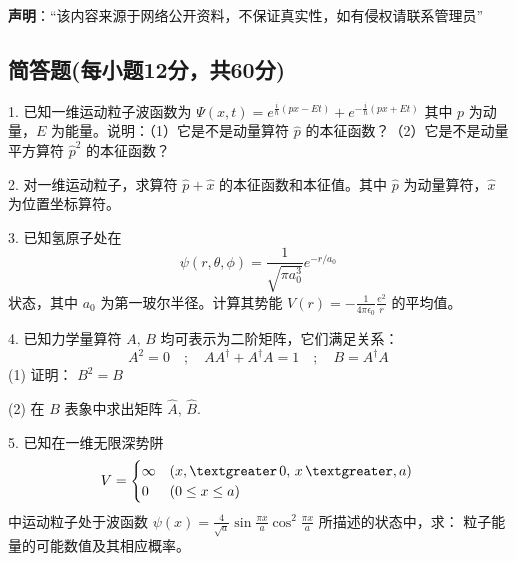 
\textbf{声明}：“该内容来源于网络公开资料，不保证真实性，如有侵权请联系管理员”

\subsection{简答题(每小题12分，共60分)}
1. 已知一维运动粒子波函数为
$ \Psi(x, t) = e^{\frac{i}{\hbar}(px - Et)} + e^{-\frac{i}{\hbar}(px + Et)}$ 
其中 $p$ 为动量，$E$ 为能量。说明：（1）它是不是动量算符 $\hat{p}$ 的本征函数？（2）它是不是动量平方算符 $\hat{p}^2$ 的本征函数？

2. 对一维运动粒子，求算符 $\hat{p} +\hat{x}$ 的本征函数和本征值。其中 $\hat{p}$ 为动量算符，$\hat{x}$ 为位置坐标算符。

3. 已知氢原子处在
$$ \psi(r, \theta, \phi) = \frac{1}{\sqrt{\pi a_0^3}} e^{-r/a_0}~$$ 
状态，其中 $a_0$ 为第一玻尔半径。计算其势能 $V(r) = -\frac{1}{4\pi \epsilon_0} \frac{e^2}{r}$ 的平均值。

4. 已知力学量算符 $A, \, B$ 均可表示为二阶矩阵，它们满足关系：
$$A^2 = 0 \quad ; \quad AA^{\dagger} + A^{\dagger}A = 1 \quad ; \quad B = A^{\dagger}A~$$
(1) 证明： $B^2 = B$

(2) 在 $B$ 表象中求出矩阵 $\hat{A}, \, \hat{B}$.

5. 已知在一维无限深势阱
$$V = 
\begin{cases}
\infty & (x , \textgreater \, 0, \, x \, \textgreater , a) \\
0 & (0 \leq x \leq a)
\end{cases}~$$
中运动粒子处于波函数 $\psi(x) = \frac{4}{\sqrt{a}} \sin{\frac{\pi x}{a}} \cos^2{\frac{\pi x}{a}}$ 所描述的状态中，求：
粒子能量的可能数值及其相应概率。
